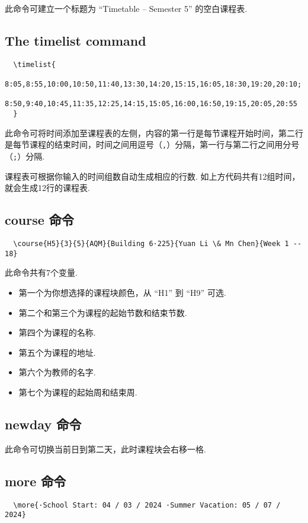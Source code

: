 \documentclass[11pt]{article}
\def\cmd#1{\texorpdfstring{\textcolor{cmdcolor}{\textsf{#1}}}{“#1”}}
\begin{document}
此命令可建立一个标题为 ``Timetable -- Semester 5'' 的空白课程表.

\subsection{The \cmd{timelist} command}
\begin{verbatim}
  \timelist{
    8:05,8:55,10:00,10:50,11:40,13:30,14:20,15:15,16:05,18:30,19:20,20:10;
    8:50,9:40,10:45,11:35,12:25,14:15,15:05,16:00,16:50,19:15,20:05,20:55
  }
\end{verbatim}

此命令可将时间添加至课程表的左侧，内容的第一行是每节课程开始时间，第二行是每节课程的结束时间，时间之间用逗号（\verb|,|）分隔，第一行与第二行之间用分号（\verb|;|）分隔.

课程表可根据你输入的时间组数自动生成相应的行数. 如上方代码共有12组时间，就会生成12行的课程表.

\subsection{\cmd{course} 命令}
\begin{verbatim}
  \course{H5}{3}{5}{AQM}{Building 6·225}{Yuan Li \& Mn Chen}{Week 1 -- 18}
\end{verbatim}

此命令共有7个变量.
\begin{itemize}
  \item 第一个为你想选择的课程块颜色，从 ``H1'' 到 ``H9'' 可选.
  \item 第二个和第三个为课程的起始节数和结束节数.
  \item 第四个为课程的名称.
  \item 第五个为课程的地址.
  \item 第六个为教师的名字.
  \item 第七个为课程的起始周和结束周.
\end{itemize}

\subsection{\cmd{newday} 命令}
此命令可切换当前日到第二天，此时课程块会右移一格.

\subsection{\cmd{more} 命令}
\begin{verbatim}
  \more{·School Start: 04 / 03 / 2024 ·Summer Vacation: 05 / 07 / 2024}
\end{verbatim}
\end{document}
